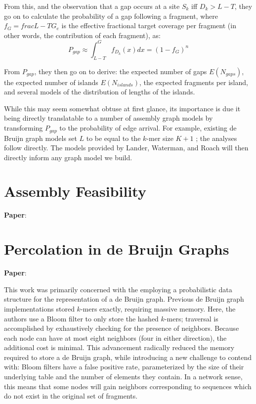 \documentclass[]{article}
\begin{document}
From this, and the observation that a gap occurs at a site $S_k$ iff $D_k > L - T$, they
go on to calculate the probability of a gap following a fragment, where $f_G = 
frac{L-T}{G_e}$ is the effective fractional target coverage per fragment (in other words, 
the contribution 
of each fragment), as:
$$P_{gap} \approx \int_{L-T}^{G}{f_{D_k}(x)dx}=(1-f_G)^n$$

From $P_{gap}$, they then go on to derive: the expected number of gaps
$E(N_{gaps})$, the expected number of islands $E(N_{islands})$, the expected fragments
per island, and several models of the distribution of lengths of the islands.

While this may seem somewhat obtuse at first glance, its importance is due it being
directly translatable to a number of assembly graph models by transforming $P_{gap}$
to the probability of edge arrival. For example, existing de Bruijn graph models
set $L$ to be equal to the $k$-mer size $K + 1$ \cite{bresler_optimal_2013}; the analyses 
follow directly. The models provided by Lander, Waterman, and Roach will then directly 
inform any graph model we build.

\section{Assembly Feasibility}

\textbf{Paper}:  

\section{Percolation in de Bruijn Graphs}
\textbf{Paper}: 

This work was primarily concerned with the employing a probabilistic data structure
for the representation of a de Bruijn graph. Previous de Bruijn graph implementations 
stored $k$-mers exactly, requiring massive memory. Here, the authors use a Bloom
filter \cite{broder_network_2004} to only store the hashed $k$-mers; traversal is 
accomplished by exhaustively checking for the presence of neighbors. Because each node 
can have at most eight neighbors (four in either direction), the additional cost is 
minimal. This advancement radically reduced the memory required to store a de Bruijn 
graph, while introducing a new challenge to contend with: Bloom filters have a false 
positive rate, parameterized by the size of their underlying table and the number of 
elements they contain. In a network sense, this means that some nodes will gain neighbors
corresponding to sequences which do not exist in the original set of fragments.
\end{document}
